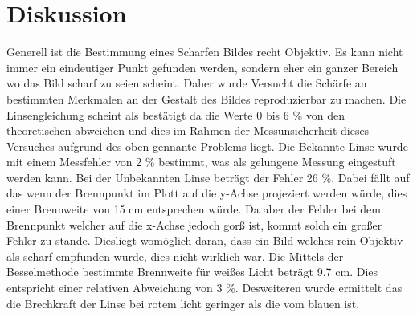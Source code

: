 \section{Diskussion}
\label{sec:Diskussion}
Generell ist die Bestimmung eines Scharfen Bildes recht Objektiv. Es kann nicht immer ein eindeutiger Punkt gefunden werden, sondern eher ein ganzer Bereich wo das Bild scharf zu seien scheint. Daher wurde Versucht die Schärfe an bestimmten Merkmalen an der Gestalt des Bildes reproduzierbar zu machen. 
Die Linsengleichung scheint als bestätigt da die Werte 0 bis 6 \% von den theoretischen abweichen und dies im Rahmen der Messunsicherheit dieses Versuches aufgrund des oben gennante Problems liegt.
Die Bekannte Linse wurde mit einem Messfehler von 2 \% bestimmt, was als gelungene Messung eingestuft werden kann. 
Bei der Unbekannten Linse beträgt der Fehler 26 \%. Dabei fällt auf das wenn der Brennpunkt im Plott auf die y-Achse projeziert werden würde, dies einer Brennweite von 15 cm entsprechen würde. Da aber der Fehler bei dem Brennpunkt welcher auf  die x-Achse jedoch gorß ist, kommt solch ein großer Fehler zu stande. Diesliegt womöglich daran, dass ein Bild welches rein Objektiv als scharf empfunden wurde, dies nicht wirklich war.
Die Mittels der Besselmethode bestimmte Brennweite für weißes Licht beträgt 9.7 cm. Dies entspricht einer relativen Abweichung von 3 \%. Desweiteren wurde ermittelt das die Brechkraft der Linse bei rotem licht geringer als die vom blauen ist.

